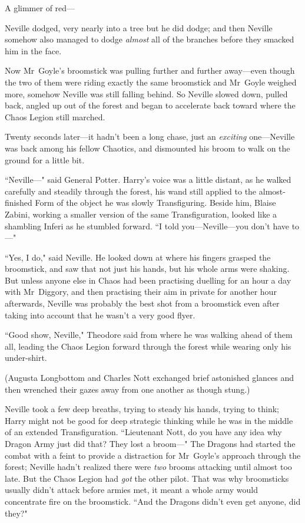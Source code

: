 A glimmer of red—

Neville dodged, very nearly into a tree but he did dodge; and then Neville somehow also managed to dodge \emph{almost} all of the branches before they smacked him in the face.

Now Mr~Goyle's broomstick was pulling further and further away—even though the two of them were riding exactly the same broomstick and Mr~Goyle weighed more, somehow Neville was still falling behind. So Neville slowed down, pulled back, angled up out of the forest and began to accelerate back toward where the Chaos Legion still marched.

Twenty seconds later—it hadn't been a long chase, just an \emph{exciting} one—Neville was back among his fellow Chaotics, and dismounted his broom to walk on the ground for a little bit.

``Neville—" said General Potter. Harry's voice was a little distant, as he walked carefully and steadily through the forest, his wand still applied to the almost-finished Form of the object he was slowly Transfiguring. Beside him, Blaise Zabini, working a smaller version of the same Transfiguration, looked like a shambling Inferi as he stumbled forward. ``I told you—Neville—you don't have to—"

``Yes, I do," said Neville. He looked down at where his fingers grasped the broomstick, and saw that not just his hands, but his whole arms were shaking. But unless anyone else in Chaos had been practising duelling for an hour a day with Mr~Diggory, and then practising their aim in private for another hour afterwards, Neville was probably the best shot from a broomstick even after taking into account that he wasn't a very good flyer.

``Good show, Neville," Theodore said from where he was walking ahead of them all, leading the Chaos Legion forward through the forest while wearing only his under-shirt.

(Augusta Longbottom and Charles Nott exchanged brief astonished glances and then wrenched their gazes away from one another as though stung.)

Neville took a few deep breaths, trying to steady his hands, trying to think; Harry might not be good for deep strategic thinking while he was in the middle of an extended Transfiguration. ``Lieutenant Nott, do you have any idea why Dragon Army just did that? They lost a broom—" The Dragons had started the combat with a feint to provide a distraction for Mr~Goyle's approach through the forest; Neville hadn't realized there were \emph{two} brooms attacking until almost too late. But the Chaos Legion had \emph{got} the other pilot. That was why broomsticks usually didn't attack before armies met, it meant a whole army would concentrate fire on the broomstick. ``And the Dragons didn't even get anyone, did they?"

